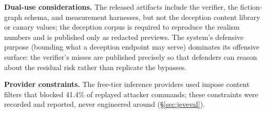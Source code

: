 \textbf{Dual-use considerations.} The released artifacts include the
verifier, the fiction-graph schema, and measurement harnesses, but not
the deception content library or canary values; the deception corpus is
required to reproduce the realism numbers and is published only as
redacted previews. The system's defensive purpose (bounding what a
deception endpoint may serve) dominates its offensive surface: the
verifier's misses are published precisely so that defenders can reason
about the residual risk rather than replicate the bypasses.

\textbf{Provider constraints.} The free-tier inference providers used
impose content filters that blocked 41.4\% of replayed attacker commands;
these constraints were recorded and reported, never engineered around
(\S\ref{sec:jeveval}).

